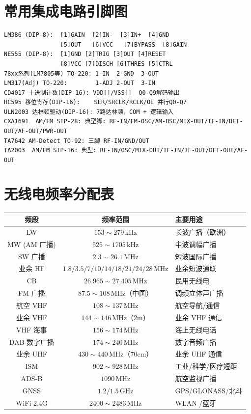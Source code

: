 \documentclass[12pt,UTF8]{ctexbook}
\begin{document}
\chapter{常用集成电路引脚图}
\begin{verbatim}
LM386 (DIP-8):  [1]GAIN  [2]IN-  [3]IN+  [4]GND
                [5]OUT   [6]VCC   [7]BYPASS  [8]GAIN
NE555 (DIP-8):  [1]GND [2]TRIG [3]OUT [4]RESET
                [8]VCC [7]DISCH [6]THRES [5]CTRL
78xx系列(LM7805等) TO-220: 1-IN  2-GND  3-OUT
LM317(Adj) TO-220:        1-ADJ 2-OUT  3-IN
CD4017 十进制计数(DIP-16): VDD[]/VSS[]  Q0-Q9解码输出
HC595 移位寄存(DIP-16):    SER/SRCLK/RCLK/OE 并行Q0-Q7
ULN2003 达林顿驱动(DIP-16): 7路达林顿，COM + 逻辑输入
CXA1691  AM/FM SIP-28: 典型脚: RF-IN/FM-OSC/AM-OSC/MIX-OUT/IF-IN/DET-OUT/AF-OUT/PWR-OUT
TA7642 AM-Detect TO-92: 三脚 RF-IN/GND/OUT
TA2003  AM/FM SIP-16: 典型: RF-IN/OSC/MIX-OUT/IF-IN/IF-OUT/DET-OUT/AF-OUT
\end{verbatim}

\chapter{无线电频率分配表}
\begin{center}
\begin{tabular}{c|c|l}
\hline
\textbf{频段} & \textbf{频率范围} & \textbf{主要用途} \\
\hline
LW & $153\sim279\,\mathrm{kHz}$ & 长波广播（欧洲） \\
MW (AM 广播) & $525\sim1705\,\mathrm{kHz}$ & 中波调幅广播 \\
SW 广播 & $2.3\sim26.1\,\mathrm{MHz}$ & 短波国际广播 \\
业余 HF & $1.8/3.5/7/10/14/18/21/24/28\,\mathrm{MHz}$ & 业余短波通联 \\
CB & $26.965\sim27.405\,\mathrm{MHz}$ & 民用无线电 \\
FM 广播 & $87.5\sim108\,\mathrm{MHz}$（中国） & 调频立体声广播 \\
航空 VHF & $108\sim137\,\mathrm{MHz}$ & 航空导航/通信 \\
业余 VHF & $144\sim146\,\mathrm{MHz}$（2m） & 业余 VHF 通信 \\
VHF 海事 & $156\sim174\,\mathrm{MHz}$ & 海上无线电话 \\
DAB 数字广播 & $174\sim240\,\mathrm{MHz}$ & 数字音频广播 \\
业余 UHF & $430\sim440\,\mathrm{MHz}$（70cm） & 业余 UHF 通信 \\
ISM & $902\sim928\,\mathrm{MHz}$ & 工业/科学/医疗短距 \\
ADS-B & $1090\,\mathrm{MHz}$ & 航空监视广播 \\
GNSS & $1.2/1.5\,\mathrm{GHz}$ & GPS/GLONASS/北斗 \\
WiFi 2.4G & $2400\sim2483\,\mathrm{MHz}$ & WLAN /蓝牙 \\
\hline
\end{tabular}
\end{center}
\end{document}
